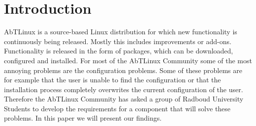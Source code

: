 \section{Introduction}



AbTLinux is a source-based Linux distribution for which new functionality is continuously being released. 
Mostly this includes improvements or add-ons. Functionality is released in the form of packages, which can be downloaded, configured and installed. 
\newline
For most of the AbTLinux Community some of the most annoying problems are the configuration problems. Some of these problems are for example that the user is unable to find the configuration or 
that the installation process completely overwrites the current configuration of the user. Therefore the AbTLinux Community has asked a group of Radboud University Students to develop
the requirements for a component that will solve these problems. In this paper we will present our findings.
